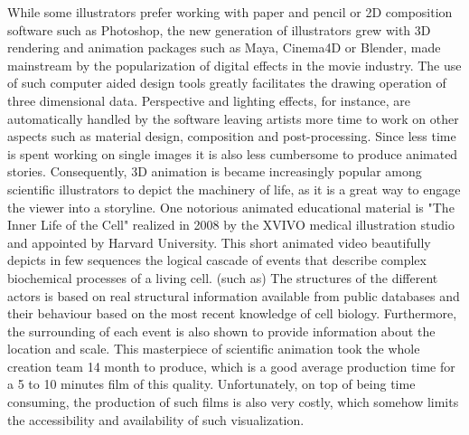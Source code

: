 While some illustrators prefer working with paper and pencil or 2D composition software such as Photoshop, the new generation of illustrators grew with 3D rendering and animation packages such as Maya, Cinema4D or Blender, made mainstream by the popularization of digital effects in the movie industry.
The use of such computer aided design tools greatly facilitates the drawing operation of three dimensional data.
Perspective and lighting effects, for instance, are automatically handled by the software leaving artists more time to work on other aspects such as material design, composition and post-processing.
Since less time is spent working on single images it is also less cumbersome to produce animated stories.
Consequently, 3D animation is became increasingly popular among scientific illustrators to depict the machinery of life, as it is a great way to engage the viewer into a storyline.
One notorious animated educational material is "The Inner Life of the Cell" realized in 2008 by the XVIVO medical illustration studio and appointed by Harvard University.
This short animated video beautifully depicts in few sequences the logical cascade of events that describe complex biochemical processes of a living cell. (such as)
The structures of the different actors is based on real structural information available from public databases and their behaviour based on the most recent knowledge of cell biology.
Furthermore, the surrounding of each event is also shown to provide information about the location and scale.
This masterpiece of scientific animation took the whole creation team 14 month to produce, which is a good average production time for a 5 to 10 minutes film of this quality.
Unfortunately, on top of being time consuming, the production of such films is also very costly, which somehow limits the accessibility and availability of such visualization.

%
%
%

